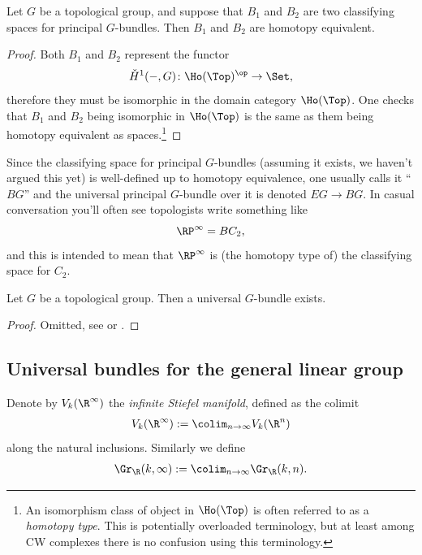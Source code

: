 \documentclass[11pt]{amsart}
\begin{document}
\begin{proposition}
Let $G$ be a topological group, and suppose that $B_1$ and $B_2$ are two classifying spaces for principal $G$-bundles. Then $B_1$ and $B_2$ are homotopy equivalent.
\end{proposition}
\begin{proof}
Both $B_1$ and $B_2$ represent the functor
\[
    \check{H}^1(-,G) \colon \Ho(\Top)^\op \to \Set,
\]
therefore they must be isomorphic in the domain category $\Ho(\Top)$. One checks that $B_1$ and $B_2$ being isomorphic in $\Ho(\Top)$ is the same as them being homotopy equivalent as spaces.\footnote{An isomorphism class of object in $\Ho(\Top)$ is often referred to as a \emph{homotopy type}. This is potentially overloaded terminology, but at least among CW complexes there is no confusion using this terminology.}
\end{proof}

\begin{notation}
Since the classifying space for principal $G$-bundles (assuming it exists, we haven't argued this yet) is well-defined up to homotopy equivalence, one usually calls it ``$BG$'' and the universal principal $G$-bundle over it is denoted $EG \to BG$. In casual conversation you'll often see topologists write something like
\[
\RP^\infty = BC_2,
\]
and this is intended to mean that $\RP^\infty$ is (the homotopy type of) the classifying space for $C_2$.
\end{notation}



\begin{theorem}
\label{thm:existence-universal-G-bundles}
Let $G$ be a topological group. Then a universal $G$-bundle exists.
\end{theorem}
\begin{proof} Omitted, see \cite[\S12.2]{AGP} or \cite[\S16.5]{maybook}.
\end{proof}

\subsection{Universal bundles for the general linear group}

\begin{notation} Denote by $V_k(\R^\infty)$ the \emph{infinite Stiefel manifold}, defined as the colimit
\begin{align*}
    V_k(\R^\infty) := \colim_{n\to\infty} V_k(\R^n)
\end{align*}
along the natural inclusions. Similarly we define
\begin{align*}
    \Gr_\R(k,\infty) := \colim_{n\to\infty} \Gr_\R(k,n).
\end{align*}
\end{notation}
\end{document}
